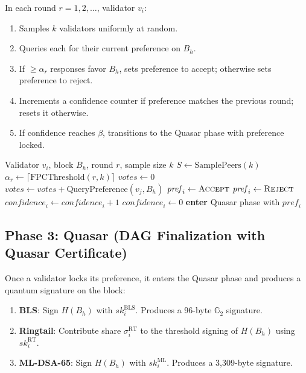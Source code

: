 \documentclass[11pt,a4paper]{article}
\begin{document}
In each round $r = 1, 2, \ldots$, validator $v_i$:
\begin{enumerate}[leftmargin=2em]
\item Samples $k$ validators uniformly at random.
\item Queries each for their current preference on $B_h$.
\item If $\geq \alpha_r$ responses favor $B_h$, sets preference to accept;
      otherwise sets preference to reject.
\item Increments a confidence counter if preference matches the previous round;
      resets it otherwise.
\item If confidence reaches $\beta$, transitions to the Quasar phase with
      preference locked.
\end{enumerate}

\begin{algorithm}
\caption{Wave: FPC voting round}
\label{alg:wave}
\begin{algorithmic}[1]
\Require Validator $v_i$, block $B_h$, round $r$, sample size $k$
\State $S \gets \text{SamplePeers}(k)$
\State $\alpha_r \gets \lceil \text{FPCThreshold}(r, k) \rceil$
\State $\mathit{votes} \gets 0$
    \State $\mathit{votes} \gets \mathit{votes} + \text{QueryPreference}(v_j, B_h)$
\EndFor
{}
    \State $\mathit{pref}_i \gets \textsc{Accept}$
\Else
    \State $\mathit{pref}_i \gets \textsc{Reject}$
\EndIf
{}
    \State $\mathit{confidence}_i \gets \mathit{confidence}_i + 1$
\Else
    \State $\mathit{confidence}_i \gets 0$
\EndIf
{}
    \State \textbf{enter} Quasar phase with $\mathit{pref}_i$
\EndIf
\end{algorithmic}
\end{algorithm}

\subsection{Phase 3: Quasar (DAG Finalization with Quasar Certificate)}

Once a validator locks its preference, it enters the Quasar phase and produces
a quantum signature on the block:

\begin{enumerate}[leftmargin=2em]
\item \textbf{BLS}: Sign $H(B_h)$ with $\mathit{sk}_i^{\mathrm{BLS}}$.
      Produces a 96-byte $\mathbb{G}_2$ signature.
\item \textbf{Ringtail}: Contribute share $\sigma_i^{\mathrm{RT}}$ to the
      threshold signing of $H(B_h)$ using $\mathit{sk}_i^{\mathrm{RT}}$.
\item \textbf{ML-DSA-65}: Sign $H(B_h)$ with $\mathit{sk}_i^{\mathrm{ML}}$.
      Produces a 3{,}309-byte signature.
\end{enumerate}
\end{document}
